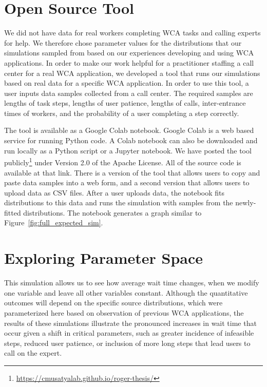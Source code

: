 \section{Open Source Tool}

We did not have data for real workers completing WCA tasks and calling experts
for help.
We therefore chose parameter values for the distributions that our simulations
sampled from based on our experiences developing and using WCA applications.
In order to make our work helpful for a practitioner staffing a call center for
a real WCA application, we developed a tool that runs our simulations based on
real data for a specific WCA application.
In order to use this tool, a user inputs data samples collected from a call
center.
The required samples are lengths of task steps, lengths of user patience,
lengths of calls, inter-entrance times of workers, and the probability of a user
completing a step correctly.

The tool is available as a Google Colab notebook.
Google Colab is a web based service for running Python code.
A Colab notebook can also be downloaded and run locally as a Python script or a
Jupyter notebook.
We have posted the tool
publicly\footnote{\url{https://cmusatyalab.github.io/roger-thesis/}} under
Version 2.0 of the Apache License.
All of the source code is available at that link.
There is a version of the tool that allows users to copy and paste data samples
into a web form, and a second version that allows users to upload data as CSV
files.
After a user uploads data, the notebook fits distributions to this data and
runs the simulation with samples from the newly-fitted distributions.
The notebook generates a graph similar to Figure~\ref{fig:full_expected_sim}.

\section{Exploring Parameter Space}

This simulation allows us to see how average wait time changes, when we modify
one variable and leave all other variables constant.
Although the quantitative outcomes will depend on the specific source
distributions, which were parameterized here based on observation of previous
WCA applications, the results of these simulations illustrate the pronounced
increases in wait time that occur given a shift in critical parameters, such as
greater incidence of infeasible steps, reduced user patience, or inclusion of
more long steps that lead users to call on the expert.


